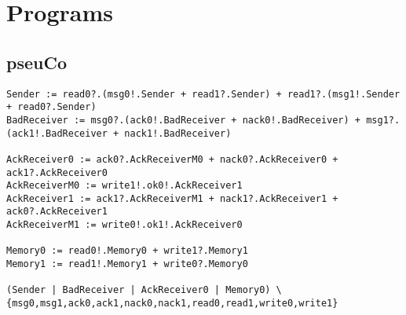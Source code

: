 \section{Programs}\label{sec:prog}

\subsection{pseuCo}\label{sec:pseuco-script}
\begin{lstlisting}[breaklines]
Sender := read0?.(msg0!.Sender + read1?.Sender) + read1?.(msg1!.Sender + read0?.Sender)
BadReceiver := msg0?.(ack0!.BadReceiver + nack0!.BadReceiver) + msg1?.(ack1!.BadReceiver + nack1!.BadReceiver)

AckReceiver0 := ack0?.AckReceiverM0 + nack0?.AckReceiver0 + ack1?.AckReceiver0
AckReceiverM0 := write1!.ok0!.AckReceiver1
AckReceiver1 := ack1?.AckReceiverM1 + nack1?.AckReceiver1 + ack0?.AckReceiver1
AckReceiverM1 := write0!.ok1!.AckReceiver0

Memory0 := read0!.Memory0 + write1?.Memory1
Memory1 := read1!.Memory1 + write0?.Memory0

(Sender | BadReceiver | AckReceiver0 | Memory0) \ {msg0,msg1,ack0,ack1,nack0,nack1,read0,read1,write0,write1}
\end{lstlisting}

